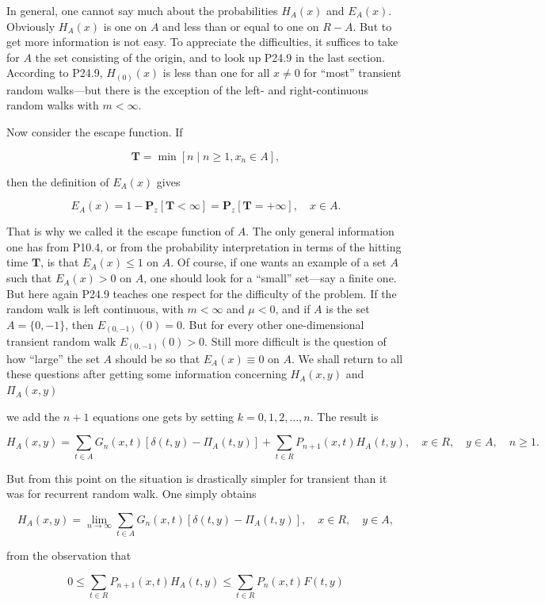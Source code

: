 In general, one cannot say much about the probabilities $H_A(x)$ and $E_A(x)$. Obviously $H_A(x)$ is one on $A$ and less than or equal to one on $R - A$. But to get more information is not easy. To appreciate the difficulties, it suffices to take for $A$ the set consisting of the origin, and to look up P24.9 in the last section. According to P24.9, $H_{(0)}(x)$ is less than one for all $x \neq 0$ for “most” transient random walks—but there is the exception of the left- and right-continuous random walks with $m < \infty$.

Now consider the escape function. If

$$\mathbf{T} = \min [n \mid n \geq 1, x_n \in A],$$

then the definition of $E_A(x)$ gives

$$E_A(x) = 1 - \mathbf{P}_z[\mathbf{T} < \infty] = \mathbf{P}_z[\mathbf{T} = +\infty], \quad x \in A.$$

That is why we called it the escape function of $A$. The only general information one has from P10.4, or from the probability interpretation in terms of the hitting time $\mathbf{T}$, is that $E_A(x) \leq 1$ on $A$. Of course, if one wants an example of a set $A$ such that $E_A(x) > 0$ on $A$, one should look for a “small” set—say a finite one. But here again P24.9 teaches one respect for the difficulty of the problem. If the random walk is left continuous, with $m < \infty$ and $\mu < 0$, and if $A$ is the set $A = \{0, -1\}$, then $E_{(0,-1)}(0) = 0$. But for every other one-dimensional transient random walk $E_{(0,-1)}(0) > 0$. Still more difficult is the question of how “large” the set $A$ should be so that $E_A(x) \equiv 0$ on $A$. We shall return to all these questions after getting some information concerning $H_A(x,y)$ and $\Pi_A(x,y)$

we add the $n + 1$ equations one gets by setting $k = 0, 1, 2, \ldots, n$. The result is

$$H_A(x,y) = \sum_{t \in A} G_n(x,t)[\delta(t,y) - \Pi_A(t,y)] + \sum_{t \in R} P_{n+1}(x,t)H_A(t,y), \quad x \in R, \quad y \in A, \quad n \geq 1.$$

But from this point on the situation is drastically simpler for transient than it was for recurrent random walk. One simply obtains

$$H_A(x,y) = \lim_{n \to \infty} \sum_{t \in A} G_n(x,t)[\delta(t,y) - \Pi_A(t,y)], \quad x \in R, \quad y \in A,$$

from the observation that

$$0 \leq \sum_{t \in R} P_{n+1}(x,t)H_A(t,y) \leq \sum_{t \in R} P_n(x,t)F(t,y)$$

